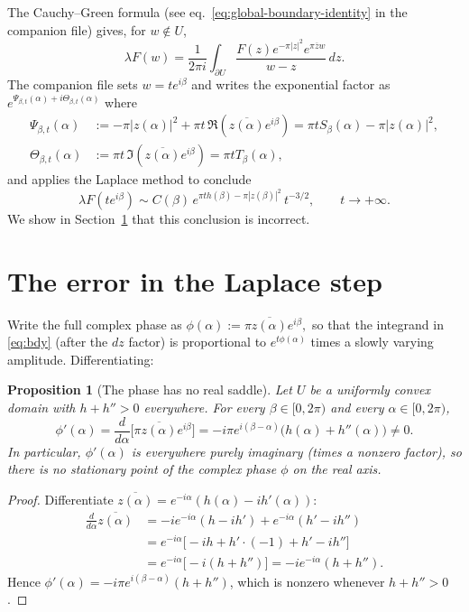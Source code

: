 \documentclass[a4paper,11pt,reqno]{amsart}
\newtheorem{proposition}{Proposition}[section]
\begin{document}
The Cauchy--Green formula (see eq.~\eqref{eq:global-boundary-identity} in the
companion file) gives, for $w\notin U$,
\begin{equation}\label{eq:bdy}
\lambda F(w)=\frac{1}{2\pi i}\int_{\partial U}
\frac{F(z)e^{-\pi|z|^2}e^{\pi\overline{z}w}}{w-z}\,dz.
\end{equation}
The companion file sets $w=te^{i\beta}$ and writes the exponential factor as
$e^{\Psi_{\beta,t}(\alpha)+i\Theta_{\beta,t}(\alpha)}$ where
\begin{align*}
\Psi_{\beta,t}(\alpha)&:=-\pi|z(\alpha)|^2+\pi t\,\Re(\overline{z(\alpha)}e^{i\beta})
=\pi tS_\beta(\alpha)-\pi|z(\alpha)|^2,\\
\Theta_{\beta,t}(\alpha)&:=\pi t\,\Im(\overline{z(\alpha)}e^{i\beta})
=\pi tT_\beta(\alpha),
\end{align*}
and applies the Laplace method to conclude
\[
\lambda F(te^{i\beta})\sim C(\beta)\,e^{\pi th(\beta)-\pi|z(\beta)|^2}\,t^{-3/2},
\qquad t\to+\infty.
\]
We show in Section~\ref{sec:error} that this conclusion is incorrect.

\section{The error in the Laplace step}
\label{sec:error}

Write the full complex phase as
$\phi(\alpha):=\pi\overline{z(\alpha)}e^{i\beta},$
so that the integrand in \eqref{eq:bdy} (after the $dz$ factor) is proportional
to $e^{t\phi(\alpha)}$ times a slowly varying amplitude. Differentiating:

\begin{proposition}[The phase has no real saddle]
\label{prop:no-saddle}
Let $U$ be a uniformly convex domain with $h+h''>0$ everywhere.
For every $\beta\in[0,2\pi)$ and every $\alpha\in[0,2\pi)$,
\[
\phi'(\alpha)=\frac{d}{d\alpha}\bigl[\pi\overline{z(\alpha)}e^{i\beta}\bigr]
=-i\pi e^{i(\beta-\alpha)}\bigl(h(\alpha)+h''(\alpha)\bigr)\neq 0.
\]
In particular, $\phi'(\alpha)$ is everywhere purely imaginary (times a nonzero
factor), so there is \emph{no} stationary point of the complex phase $\phi$ on
the real axis.
\end{proposition}

\begin{proof}
Differentiate $\overline{z(\alpha)}=e^{-i\alpha}(h(\alpha)-ih'(\alpha))$:
\begin{align*}
\frac{d}{d\alpha}\overline{z(\alpha)}
&=-ie^{-i\alpha}(h-ih')+e^{-i\alpha}(h'-ih'')\\
&=e^{-i\alpha}\bigl[-ih+h'\cdot(-1)+h'-ih''\bigr]\\
&=e^{-i\alpha}\bigl[-i(h+h'')\bigr]=-ie^{-i\alpha}(h+h'').
\end{align*}
Hence $\phi'(\alpha)=-i\pi e^{i(\beta-\alpha)}(h+h'')$, which is nonzero
whenever $h+h''>0$.
\end{proof}
\end{document}
